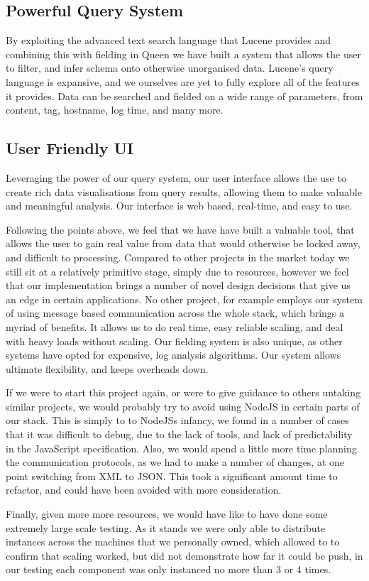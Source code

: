 \subsection{Powerful Query System}
By exploiting the advanced text search language that Lucene provides and
combining this with fielding in Queen we have built a system that allows the
user to filter, and infer schema onto otherwise unorganised data. Lucene's query
language is expansive, and we ourselves are yet to fully explore all of the
features it provides. Data can be searched and fielded on a wide range of
parameters, from content, tag, hostname, log time, and many more.
\subsection{User Friendly UI}
Leveraging the power of our query system, our user interface allows the use to
create rich data visualisations from query results, allowing them to make
valuable and meaningful analysis. Our interface is web based, real-time, and
easy to use.

Following the points above, we feel that we have have built a valuable tool,
that allows the user to gain real value from data that would otherwise be locked
away, and difficult to processing. Compared to other projects in the market
today we still sit at a relatively primitive stage, simply due to resources,
however we feel that our implementation brings a number of novel design
decisions that give us an edge in certain applications. No other project, for
example employs our system of using message based communication across the whole
stack, which brings a myriad of benefits. It allows us to do real time,  easy
reliable scaling, and deal with heavy loads without scaling. Our fielding system
is also unique, as other systems have opted for expensive, log analysis
algorithms. Our system allows ultimate flexibility, and keeps overheads down.

If we were to start this project again, or were to give guidance to others
untaking similar projects, we would probably try to avoid using NodeJS in
certain parts of our stack. This is simply to to NodeJSs infancy, we found in
a number of cases that it was difficult to debug, due to the lack of tools,
and lack of predictability in the JavaScript specification. Also, we would
spend a little more time planning the communication protocols, as we had to
make a number of changes, at one point switching from XML to JSON. This took a
significant amount time to refactor, and could have been avoided with more
consideration.

Finally, given more more resources, we would have like to have done some
extremely large scale testing. As it stands we were only able to distribute
instances across the machines that we personally owned, which allowed to to
confirm that scaling worked, but did not demonstrate how far it could be
push, in our testing each component was only instanced no more than 3 or 4
times.

